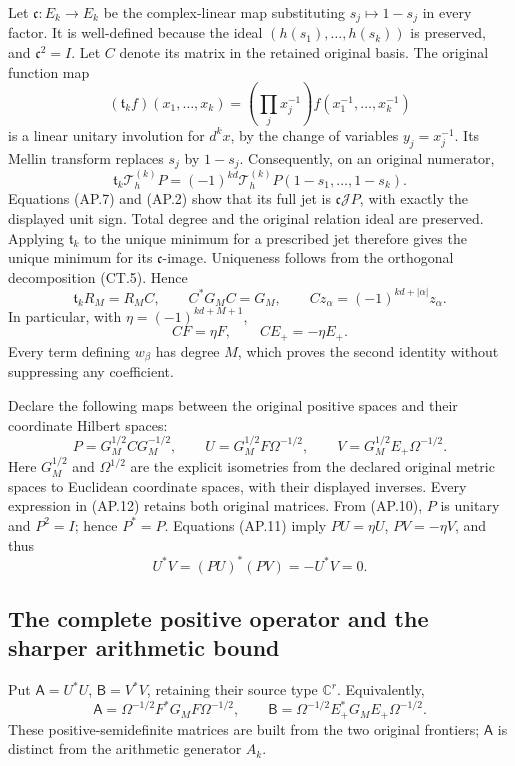 Let \(\mathfrak c:E_k\to E_k\) be the complex-linear map
substituting \(s_j\mapsto1-s_j\) in every factor.  It is
well-defined because the ideal \((h(s_1),\ldots,h(s_k))\)
is preserved, and \(\mathfrak c^2=I\).  Let \(C\) denote
its matrix in the retained original basis.  The original function
map
\[
 (\mathfrak t_kf)(x_1,\ldots,x_k)
       =\left(\prod_jx_j^{-1}\right)f(x_1^{-1},\ldots,x_k^{-1})
 \tag{AP.8}
\]
is a linear unitary involution for \(d^kx\), by the change of
variables \(y_j=x_j^{-1}\).  Its Mellin transform replaces
\(s_j\) by \(1-s_j\).  Consequently, on an original numerator,
\[
 \mathfrak t_k\mathcal T_h^{(k)}P
     =(-1)^{kd}\mathcal T_h^{(k)}P(1-s_1,\ldots,1-s_k).
 \tag{AP.9}
\]
Equations (AP.7) and (AP.2) show that its full jet is
\(\mathfrak c\mathcal J P\), with exactly the displayed
unit sign.  Total degree and the original relation ideal are
preserved.  Applying \(\mathfrak t_k\) to the unique minimum
for a prescribed jet therefore gives the unique minimum for its
\(\mathfrak c\)-image.  Uniqueness follows from the orthogonal
decomposition (CT.5).  Hence
\[
 \mathfrak t_kR_M=R_MC,\qquad C^*G_MC=G_M,
 \qquad Cz_\alpha=(-1)^{kd+|\alpha|}z_\alpha.
 \tag{AP.10}
\]
In particular, with \(\eta=(-1)^{kd+M+1}\),
\[
 CF=\eta F,\qquad CE_+=-\eta E_+.
 \tag{AP.11}
\]
Every term defining \(w_\beta\) has degree \(M\), which
proves the second identity without suppressing any coefficient.

Declare the following maps between the original positive spaces
and their coordinate Hilbert spaces:
\[
 P=G_M^{1/2}CG_M^{-1/2},\qquad
 U=G_M^{1/2}F\Omega^{-1/2},\qquad
 V=G_M^{1/2}E_+\Omega^{-1/2}.
 \tag{AP.12}
\]
Here \(G_M^{1/2}\) and \(\Omega^{1/2}\) are the explicit
isometries from the declared original metric spaces to Euclidean
coordinate spaces, with their displayed inverses.  Every expression
in (AP.12) retains both original matrices.  From (AP.10), \(P\)
is unitary and \(P^2=I\); hence \(P^*=P\).  Equations
(AP.11) imply \(PU=\eta U\), \(PV=-\eta V\), and thus
\[
 U^*V=(PU)^*(PV)=-U^*V=0.
 \tag{AP.13}
\]

\subsection{The complete positive operator and the sharper arithmetic bound}

Put \(\mathsf A=U^*U\), \(\mathsf B=V^*V\), retaining their
source type \(\mathbb C^r\).  Equivalently,
\[
 \mathsf A=\Omega^{-1/2}F^*G_MF\Omega^{-1/2},\qquad
 \mathsf B=\Omega^{-1/2}E_+^*G_ME_+\Omega^{-1/2}.
 \tag{AP.14}
\]
These positive-semidefinite matrices are built from the two original
frontiers; \(\mathsf A\) is distinct from the arithmetic generator
\(A_k\).


